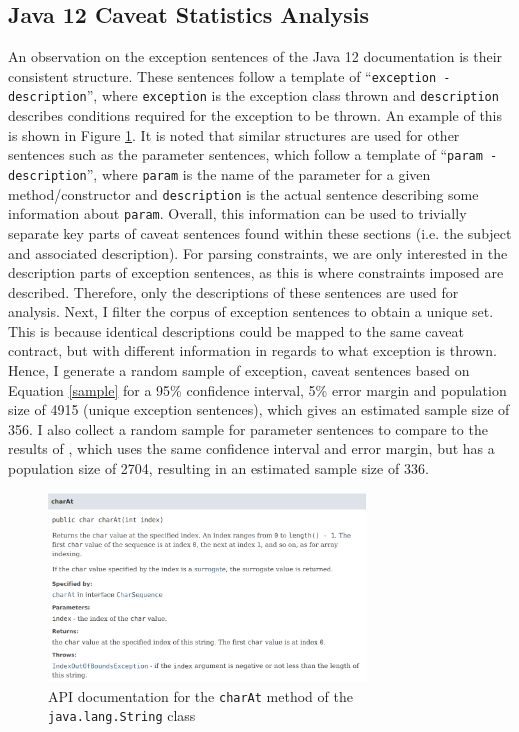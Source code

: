 \subsection{Java 12 Caveat Statistics Analysis}
\label{subsec:contract-caveat-statistics}
An observation on the exception sentences of the Java 12 documentation is their consistent structure. These sentences follow a template of ``\verb|exception - description|'', where \verb|exception| is the exception class thrown and \verb|description| describes conditions required for the exception to be thrown. An example of this is shown in Figure \ref{fig:api-doc-charAt}. It is noted that similar structures are used for other sentences such as the parameter sentences, which follow a template of ``\verb|param - description|'', where \verb|param| is the name of the parameter for a given method/constructor and \verb|description| is the actual sentence describing some information about \verb|param|.  Overall, this information can be used to trivially separate key parts of caveat sentences found within these sections (i.e. the subject and associated description). For parsing constraints, we are only interested in the description parts of exception sentences, as this is where constraints imposed are described. Therefore, only the descriptions of these sentences are used for analysis. Next, I filter the corpus of exception sentences to obtain a unique set. This is because identical descriptions could be mapped to the same caveat contract, but with different information in regards to what exception is thrown.  
Hence, I generate a random sample of exception, caveat sentences based on Equation \ref{sample} for a 95\% confidence interval, 5\% error margin and population size of 4915 (unique exception sentences), which gives an estimated sample size of 356. I also collect a random sample for parameter sentences to compare to the results of \cite{zhou-directive}, which uses the same confidence interval and error margin, but has a population size of 2704, resulting in an estimated sample size of 336.\\

\begin{figure}[h]
	\label{fig:api-doc-charAt}
	\centering
	\includegraphics[width=0.75\textwidth]{figs/api-doc-charAt.png}
	\caption{API documentation for the \lstinline{charAt} method of the \lstinline{java.lang.String} class}
\end{figure}

